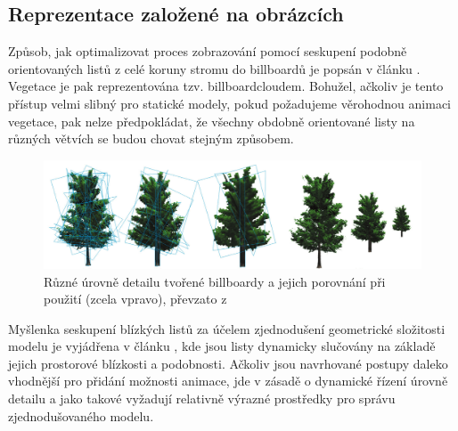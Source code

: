 \subsection{Reprezentace založené na obrázcích}



Způsob, jak optimalizovat proces zobrazování pomocí seskupení podobně orientovaných listů z celé koruny stromu do billboardů je popsán v článku \cite{GIPGSMSL07}. Vegetace je pak reprezentována tzv. billboardcloudem. Bohužel, ačkoliv je tento přístup velmi slibný pro statické modely, pokud požadujeme věrohodnou animaci vegetace, pak nelze předpokládat, že všechny obdobně orientované listy na různých větvích se budou chovat stejným způsobem.
\begin{figure}[here]
\includegraphics[width=1.0\textwidth]{./figures/umlauf_lod.png}
\caption{Různé úrovně detailu tvořené billboardy a jejich porovnání při použití (zcela vpravo), převzato z \cite{Umlauf05} }
\label{fig:UMLAUF_lod}
\end{figure}
Myšlenka seskupení blízkých listů za účelem zjednodušení geometrické složitosti modelu je vyjádřena v článku \cite{Rebollo_07_FRL}, kde jsou listy dynamicky slučovány na základě jejich prostorové blízkosti a podobnosti. Ačkoliv jsou navrhované postupy daleko vhodnější pro přidání možnosti animace, jde v zásadě o dynamické řízení úrovně detailu a jako takové vyžadují relativně výrazné prostředky pro správu zjednodušovaného modelu. 

